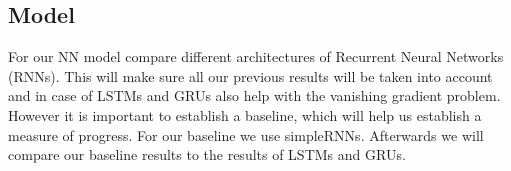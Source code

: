 \documentclass[
	ngerman,
	ruledheaders=section,%
	class=report,%
	thesis={type=bachelor},%
	accentcolor=9c,%
	custommargins=true,%
	marginpar=false,%
	parskip=half-,%
	fontsize=11pt,%
]{tudapub}
\begin{document}






\subsection{Model}


For our NN model compare different architectures of Recurrent Neural Networks (RNNs).
This will make sure all our previous results will be taken into account and in case of LSTMs and GRUs also help with the vanishing gradient problem.
However it is important to establish a baseline, which will help us establish a measure of progress. %
For our baseline we use simpleRNNs.
Afterwards we will compare our baseline results to the results of LSTMs and GRUs.
\end{document}
